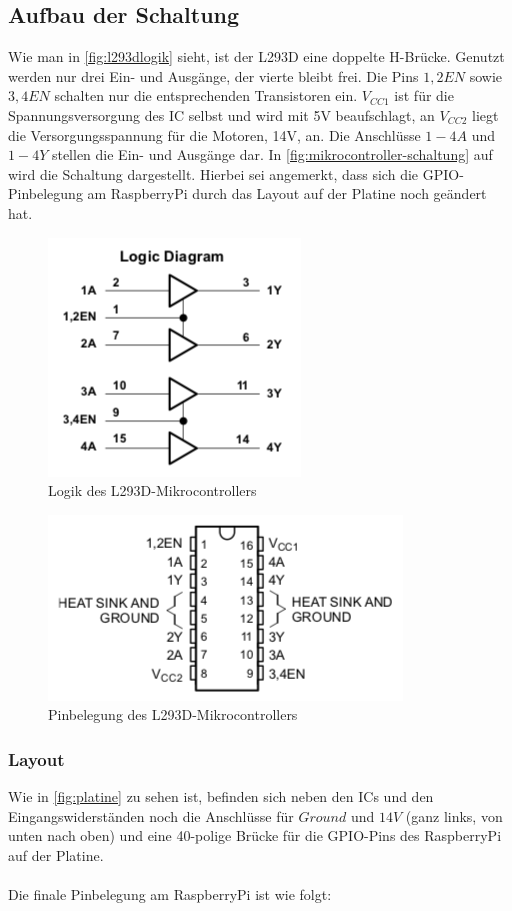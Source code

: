 \documentclass[12pt,a4paper,bibliography=totocnumbered,listof=totocnumbered]{scrartcl}
\begin{document}
\subsection{Aufbau der Schaltung}
Wie man in \autoref{fig:l293dlogik} sieht, ist der L293D eine doppelte H-Brücke. Genutzt werden nur drei Ein- und Ausgänge, der vierte bleibt frei. Die Pins $1,2EN$ sowie $3,4EN$ schalten nur die entsprechenden Transistoren ein. $V_{CC1}$ ist für die Spannungsversorgung des IC selbst und wird mit 5V beaufschlagt, an $V_{CC2}$ liegt die Versorgungsspannung für die Motoren, 14V, an. Die Anschlüsse $1-4A$ und $1-4Y$ stellen die Ein- und Ausgänge dar. In \autoref{fig:mikrocontroller-schaltung} auf  wird die Schaltung dargestellt. Hierbei sei angemerkt, dass sich die GPIO-Pinbelegung am RaspberryPi durch das Layout auf der Platine noch geändert hat.
\begin{figure}[th]
	\centering
	\includegraphics[width=0.4\linewidth]{l293d_logik}
	\caption{Logik des L293D-Mikrocontrollers \cite{l293d}}
	\label{fig:l293dlogik}
\end{figure}

\begin{figure}[th]
	\centering
	\includegraphics[width=0.6\linewidth]{l293d_pins}
	\caption{Pinbelegung des L293D-Mikrocontrollers \cite{l293d}}
	\label{fig:l293dpins}
\end{figure}

\subsubsection{Layout}
Wie in \autoref{fig:platine} zu sehen ist, befinden sich neben den ICs und den Eingangswiderständen noch die Anschlüsse für $Ground$ und $14V$ (ganz links, von unten nach oben) und eine 40-polige Brücke für die GPIO-Pins des RaspberryPi auf der Platine.\\\\
Die finale Pinbelegung am RaspberryPi ist wie folgt:
\end{document}
